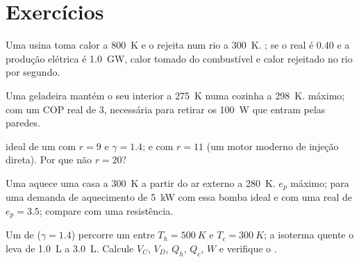\section{Exercícios}

\begin{exercise}[$\star$]\label{exo:b1:heat-engines:1}
Uma usina toma calor a \qty{800}{K} e o rejeita num rio a
\qty{300}{K}. ; se o  real é $0.40$ e a
produção elétrica é \qty{1.0}{GW}, calor tomado do combustível e calor
rejeitado no rio por segundo.
\end{exercise}

\begin{exercise}[$\star$]\label{exo:b1:heat-engines:2}
Uma geladeira mantém o seu interior a \qty{275}{K} numa cozinha a
\qty{298}{K}.  máximo; com um COP real de $3$,
 necessária para retirar os \qty{100}{W} que entram pelas
paredes.
\end{exercise}

\begin{exercise}[$\star$]\label{exo:b1:heat-engines:3}
 ideal de um  com $r = 9$ e $\gamma = 1.4$; e com
$r = 11$ (um motor moderno de injeção direta). Por que não $r = 20$?
\end{exercise}

\begin{exercise}[$\star$]\label{exo:b1:heat-engines:4}
Uma  aquece uma casa a \qty{300}{K} a partir do ar externo a \qty{280}{K}.
$e_p$ máximo;  para uma demanda de aquecimento de
\qty{5}{kW} com essa bomba ideal e com uma real de $e_p = 3.5$; compare com
uma resistência.
\end{exercise}

\begin{exercise}[$\star\star$]\label{exo:b1:heat-engines:5}
Um  de  ($\gamma = 1.4$) percorre um  entre
$T_h = \qty{500}{K}$ e $T_c = \qty{300}{K}$; a isoterma quente o leva de
\qty{1.0}{L} a \qty{3.0}{L}. Calcule $V_C$, $V_D$, $Q_h$, $Q_c$, $W$ e
verifique o .
\end{exercise}

